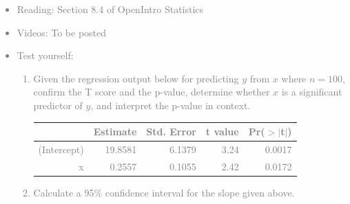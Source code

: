 \documentclass[11pt]{article}
\newcommand{\gray}[1]{\textcolor{gray}{#1}}
\begin{document}
\gray{
{\it
\vspace{-0.55cm}
\begin{itemize}
\renewcommand{\labelitemi}{{\textcolor{dark}{$\ast$}}}
\item Reading: Section 8.4 of OpenIntro Statistics
\item Videos: To be posted 
\item Test yourself: 
\begin{enumerate}
\item Given the regression output below for predicting $y$ from $x$ where $n = 100$, confirm the T score and the p-value, determine whether $x$ is a significant predictor of $y$, and interpret the p-value in context.
\begin{center}
\begin{tabular}{rrrrr}
  \hline
 & Estimate & Std. Error & t value & Pr($>$$|$t$|$) \\ 
  \hline
(Intercept) & 19.8581 & 6.1379 & 3.24 & 0.0017 \\ 
  x & 0.2557 & 0.1055 & 2.42 & 0.0172 \\ 
   \hline
\end{tabular}
\end{center}
\item Calculate a 95\% confidence interval for the slope given above.
\end{enumerate}
\end{itemize}
}}
\end{document}
